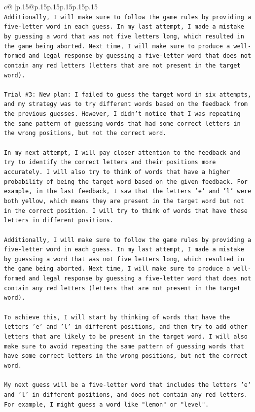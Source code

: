 \documentclass{article}
\begin{document}
{\begin{supertabular}{c@{$\;$}|p{.15\linewidth}@{}p{.15\linewidth}p{.15\linewidth}p{.15\linewidth}p{.15\linewidth}p{.15\linewidth}}
{{{\\ 
\texttt{Additionally, I will make sure to follow the game rules by providing a five{-}letter word in each guess. In my last attempt, I made a mistake by guessing a word that was not five letters long, which resulted in the game being aborted. Next time, I will make sure to produce a well{-}formed and legal response by guessing a five{-}letter word that does not contain any red letters (letters that are not present in the target word).} \\
\\ 
\texttt{Trial \#3: New plan: I failed to guess the target word in six attempts, and my strategy was to try different words based on the feedback from the previous guesses. However, I didn't notice that I was repeating the same pattern of guessing words that had some correct letters in the wrong positions, but not the correct word. } \\
\\ 
\texttt{In my next attempt, I will pay closer attention to the feedback and try to identify the correct letters and their positions more accurately. I will also try to think of words that have a higher probability of being the target word based on the given feedback. For example, in the last feedback, I saw that the letters 'e' and 'l' were both yellow, which means they are present in the target word but not in the correct position. I will try to think of words that have these letters in different positions.} \\
\\ 
\texttt{Additionally, I will make sure to follow the game rules by providing a five{-}letter word in each guess. In my last attempt, I made a mistake by guessing a word that was not five letters long, which resulted in the game being aborted. Next time, I will make sure to produce a well{-}formed and legal response by guessing a five{-}letter word that does not contain any red letters (letters that are not present in the target word).} \\
\\ 
\texttt{To achieve this, I will start by thinking of words that have the letters 'e' and 'l' in different positions, and then try to add other letters that are likely to be present in the target word. I will also make sure to avoid repeating the same pattern of guessing words that have some correct letters in the wrong positions, but not the correct word. } \\
\\ 
\texttt{My next guess will be a five{-}letter word that includes the letters 'e' and 'l' in different positions, and does not contain any red letters. For example, I might guess a word like "lemon" or "level".} \\
}}}
\end{supertabular}}
\end{document}
